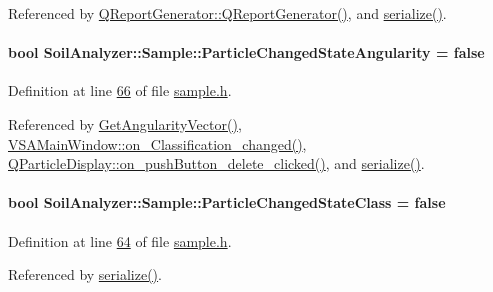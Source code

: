 Referenced by \hyperlink{qreportgenerator_8cpp_source_l00004}{Q\+Report\+Generator\+::\+Q\+Report\+Generator()}, and \hyperlink{sample_8h_source_l00085}{serialize()}.

\hypertarget{class_soil_analyzer_1_1_sample_a7ee3c324a437d466c014cbbfcfb4a244}{}
\paragraph[{Particle\+Changed\+State\+Angularity}]{\setlength{\rightskip}{0pt plus 5cm}bool Soil\+Analyzer\+::\+Sample\+::\+Particle\+Changed\+State\+Angularity = false}\label{class_soil_analyzer_1_1_sample_a7ee3c324a437d466c014cbbfcfb4a244}


Definition at line \hyperlink{sample_8h_source_l00066}{66} of file \hyperlink{sample_8h_source}{sample.\+h}.



Referenced by \hyperlink{sample_8cpp_source_l00072}{Get\+Angularity\+Vector()}, \hyperlink{vsamainwindow_8cpp_source_l00522}{V\+S\+A\+Main\+Window\+::on\+\_\+\+Classification\+\_\+changed()}, \hyperlink{qparticledisplay_8cpp_source_l00096}{Q\+Particle\+Display\+::on\+\_\+push\+Button\+\_\+delete\+\_\+clicked()}, and \hyperlink{sample_8h_source_l00085}{serialize()}.

\hypertarget{class_soil_analyzer_1_1_sample_ad2efb0f5bee8910f2a2fb69353a7de6d}{}
\paragraph[{Particle\+Changed\+State\+Class}]{\setlength{\rightskip}{0pt plus 5cm}bool Soil\+Analyzer\+::\+Sample\+::\+Particle\+Changed\+State\+Class = false}\label{class_soil_analyzer_1_1_sample_ad2efb0f5bee8910f2a2fb69353a7de6d}


Definition at line \hyperlink{sample_8h_source_l00064}{64} of file \hyperlink{sample_8h_source}{sample.\+h}.



Referenced by \hyperlink{sample_8h_source_l00085}{serialize()}.

